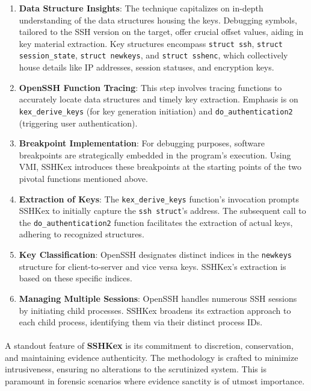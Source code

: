     \begin{enumerate}
        \item \textbf{Data Structure Insights}: The technique capitalizes on in-depth understanding of the data structures housing the keys. Debugging symbols, tailored to the SSH version on the target, offer crucial offset values, aiding in key material extraction. Key structures encompass \texttt{struct ssh}, \texttt{struct session\_state}, \texttt{struct newkeys}, and \texttt{struct sshenc}, which collectively house details like IP addresses, session statuses, and encryption keys.
        \item \textbf{OpenSSH Function Tracing}: This step involves tracing functions to accurately locate data structures and timely key extraction. Emphasis is on \texttt{kex\_derive\_keys} (for key generation initiation) and \texttt{do\_authentication2} (triggering user authentication).
        \item \textbf{Breakpoint Implementation}: For debugging purposes, software breakpoints are strategically embedded in the program's execution. Using VMI, SSHKex introduces these breakpoints at the starting points of the two pivotal functions mentioned above.
        \item \textbf{Extraction of Keys}: The \texttt{kex\_derive\_keys} function's invocation prompts SSHKex to initially capture the \texttt{ssh struct}'s address. The subsequent call to the \texttt{do\_authentication2} function facilitates the extraction of actual keys, adhering to recognized structures.
        \item \textbf{Key Classification}: OpenSSH designates distinct indices in the \texttt{newkeys} structure for client-to-server and vice versa keys. SSHKex's extraction is based on these specific indices.
        \item \textbf{Managing Multiple Sessions}: OpenSSH handles numerous SSH sessions by initiating child processes. SSHKex broadens its extraction approach to each child process, identifying them via their distinct process IDs.
    \end{enumerate}

    \paragraph{}A standout feature of \textbf{SSHKex} is its commitment to discretion, conservation, and maintaining evidence authenticity. The methodology is crafted to minimize intrusiveness, ensuring no alterations to the scrutinized system. This is paramount in forensic scenarios where evidence sanctity is of utmost importance.


